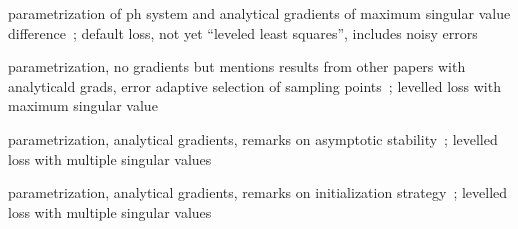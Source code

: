 parametrization of ph system and analytical gradients of maximum singular value difference~\cite{Schwerdtner2021}; default loss, not yet ``leveled least squares'', includes noisy errors

parametrization, no gradients but mentions results from other papers with analyticald grads, error adaptive selection of sampling points~\cite{SV2021}; levelled loss with maximum singular value

parametrization, analytical gradients, remarks on asymptotic stability~\cite{Schwerdtner2022}; levelled loss with multiple singular values

parametrization, analytical gradients, remarks on initialization strategy~\cite{Schwerdtner2023}; levelled loss with multiple singular values
